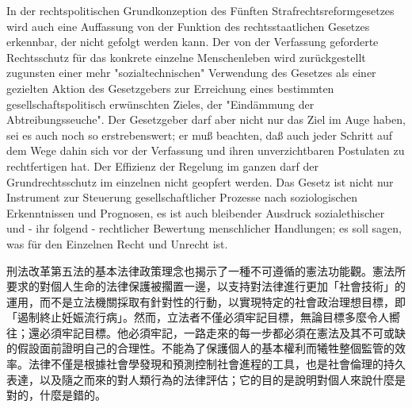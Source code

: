 \documentclass[12pt]{article}
\begin{document}
\syncleft
\begin{sourcepara}
In der rechtspolitischen Grundkonzeption des Fünften Strafrechtsreformgesetzes wird auch eine Auffassung von der Funktion des rechtsstaatlichen Gesetzes erkennbar, der nicht gefolgt werden kann. Der von der Verfassung geforderte Rechtsschutz für das konkrete einzelne Menschenleben wird zurückgestellt zugunsten einer mehr "sozialtechnischen" Verwendung des Gesetzes als einer gezielten Aktion des Gesetzgebers zur Erreichung eines bestimmten gesellschaftspolitisch erwünschten Zieles, der "Eindämmung der Abtreibungsseuche". Der Gesetzgeber darf aber nicht nur das Ziel im Auge haben, sei es auch noch so erstrebenswert; er muß beachten, daß auch jeder Schritt auf dem Wege dahin sich vor der Verfassung und ihren unverzichtbaren Postulaten zu rechtfertigen hat. Der Effizienz der Regelung im ganzen darf der Grundrechtsschutz im einzelnen nicht geopfert werden. Das Gesetz ist nicht nur Instrument zur Steuerung gesellschaftlicher Prozesse nach soziologischen Erkenntnissen und Prognosen, es ist auch bleibender Ausdruck sozialethischer und - ihr folgend - rechtlicher Bewertung menschlicher Handlungen; es soll sagen, was für den Einzelnen Recht und Unrecht ist.
\end{sourcepara}
\begin{transpara}
刑法改革第五法的基本法律政策理念也揭示了一種不可遵循的憲法功能觀。憲法所要求的對個人生命的法律保護被擱置一邊，以支持對法律進行更加「社會技術」的運用，而不是立法機關採取有針對性的行動，以實現特定的社會政治理想目標，即「遏制終止妊娠流行病」。然而，立法者不僅必須牢記目標，無論目標多麼令人嚮往；還必須牢記目標。他必須牢記，一路走來的每一步都必須在憲法及其不可或缺的假設面前證明自己的合理性。不能為了保護個人的基本權利而犧牲整個監管的效率。法律不僅是根據社會學發現和預測控制社會進程的工具，也是社會倫理的持久表達，以及隨之而來的對人類行為的法律評估；它的目的是說明對個人來說什麼是對的，什麼是錯的。
\end{transpara}
\end{document}

